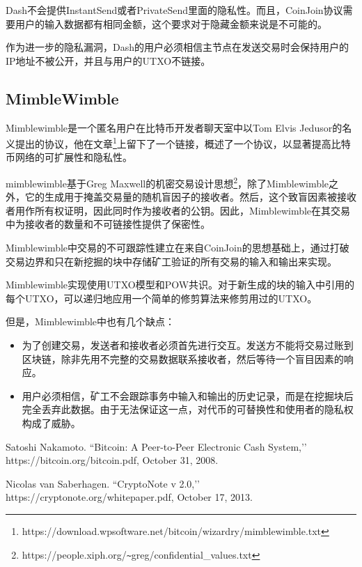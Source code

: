 \documentclass[8pt,fleqn,openany]{book}
\begin{document}
\begin{CJK*}{UTF8}{gbsn}
{Dash不会提供InstantSend或者PrivateSend里面的隐私性。而且，CoinJoin协议需要用户的输入数据都有相同金额，这个要求对于隐藏金额来说是不可能的。

作为进一步的隐私漏洞，Dash的用户必须相信主节点在发送交易时会保持用户的IP地址不被公开，并且与用户的UTXO不链接。

\subsection{MimbleWimble} Mimblewimble是一个匿名用户在比特币开发者聊天室中以Tom Elvis Jedusor的名义提出的协议，他在文章\footnote{https://download.wpsoftware.net/bitcoin/wizardry/mimblewimble.txt}上留下了一个链接，概述了一个协议，以显著提高比特币网络的可扩展性和隐私性。

mimblewimble基于Greg Maxwell的机密交易设计思想\footnote{https://people.xiph.org/\texttt{\~}greg/confidential\_values.txt}，除了Mimblewimble之外，它的生成用于掩盖交易量的随机盲因子的接收者。然后，这个致盲因素被接收者用作所有权证明，因此同时作为接收者的公钥。因此，Mimblewimble在其交易中为接收者的数量和不可链接性提供了保密性。

Mimblewimble中交易的不可跟踪性建立在来自CoinJoin的思想基础上，通过打破交易边界和只在新挖掘的块中存储矿工验证的所有交易的输入和输出来实现。

Mimblewimble实现使用UTXO模型和POW共识。对于新生成的块的输入中引用的每个UTXO，可以递归地应用一个简单的修剪算法来修剪用过的UTXO。

但是，Mimblewimble中也有几个缺点：

\begin{itemize}
  \item {为了创建交易，发送者和接收者必须首先进行交互。发送方不能将交易过账到区块链，除非先用不完整的交易数据联系接收者，然后等待一个盲目因素的响应。}
  \item {用户必须相信，矿工不会跟踪事务中输入和输出的历史记录，而是在挖掘块后完全丢弃此数据。由于无法保证这一点，对代币的可替换性和使用者的隐私权构成了威胁。}
\end{itemize}


\newpage
\raggedright
% 
% 

\begin{thebibliography}{99}

 Satoshi Nakamoto. ``Bitcoin: A Peer-to-Peer Electronic Cash System,’’ https://bitcoin.org/bitcoin.pdf, October 31, 2008.

 Nicolas van Saberhagen. ``CryptoNote v 2.0,’’ https://cryptonote.org/whitepaper.pdf, October 17, 2013.


\end{thebibliography}}
\end{CJK*}
\end{document}
